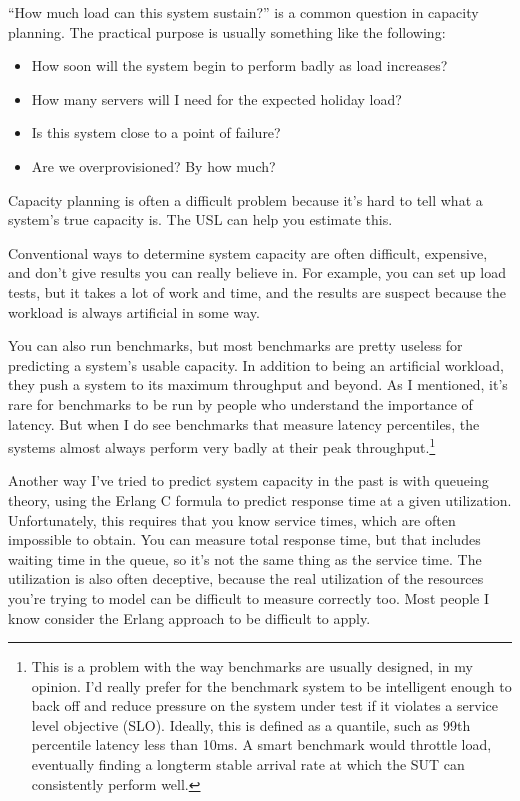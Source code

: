 \documentclass{vivid_layout}
\begin{document}
``How much load can this system sustain?'' is a common question in capacity
planning. The practical purpose is usually something like the following:

\begin{itemize}
\item How soon will the system begin to perform badly as load increases?
\item How many servers will I need for the expected holiday load?
\item Is this system close to a point of failure?
\item Are we overprovisioned? By how much?
\end{itemize}

Capacity planning is often a difficult problem because it's hard to tell what a
system's true capacity is. The USL can help you estimate this.

Conventional ways to determine system capacity are often difficult, expensive,
and don't give results you can really believe in. For example, you can set up
load tests, but it takes a lot of work and time, and the results are suspect
because the workload is always artificial in some way.

You can also run benchmarks, but most benchmarks are pretty useless for
predicting a system's usable capacity. In addition to being an artificial
workload, they push a system to its maximum throughput and beyond. As I
mentioned, it's rare for benchmarks to be run by people who understand the
importance of latency. But when I do see benchmarks that measure latency
percentiles, the systems almost always perform very badly at their peak
throughput.\footnote{This is a problem with the way benchmarks are usually
designed, in my opinion. I'd really prefer for the benchmark system to be
intelligent enough to back off and reduce pressure on the system under test if
it violates a service level objective (SLO).  Ideally, this is defined as a
quantile, such as 99th percentile latency less than 10ms.  A smart benchmark
would throttle load, eventually finding a longterm stable arrival rate at which
the SUT can consistently perform well.}

Another way I've tried to predict system capacity in the past is with queueing
theory, using the Erlang C formula to predict response time at a given
utilization.  Unfortunately, this requires that you know service times,
which are often impossible to obtain. You can measure total response time, but
that includes waiting time in the queue, so it's not the same thing as the
service time. The utilization is also often deceptive, because the real
utilization of the resources you're trying to model can be difficult to
measure correctly too. Most people I know consider the Erlang approach to be
difficult to apply.
\end{document}
